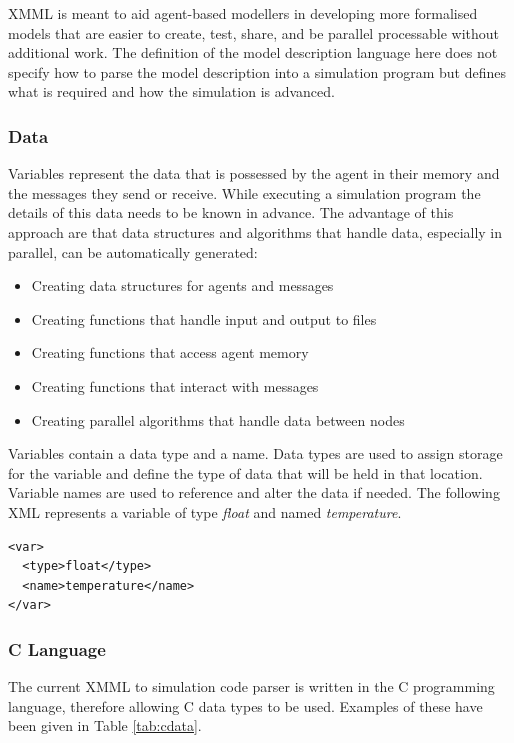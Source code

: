\documentclass[a4paper,11pt]{article}
\newenvironment{mylisting}
{\begin{list}{}{\setlength{\leftmargin}{1em}}\item\small\bfseries}
{\end{list}}
\begin{document}
XMML is meant to aid agent-based modellers in developing more
formalised models that are easier to create, test, share, and be
parallel processable without additional work. The definition of the
model description language here does not specify how to parse the
model description into a simulation program but defines what is
required and how the simulation is advanced.

\subsubsection{Data}

Variables represent the data that is possessed by the agent in their
memory and the messages they send or receive. While executing a
simulation program the details of this data needs to be known in advance. The advantage of this approach are that data structures and algorithms that handle data, especially in parallel, can be automatically generated:

\begin{itemize}
\item Creating data structures for agents and messages
\item Creating functions that handle input and output to files
\item Creating functions that access agent memory
\item Creating functions that interact with messages
\item Creating parallel algorithms that handle data between nodes
\end{itemize}

Variables contain a data type and a name. Data types are used to assign storage for the variable and define the type of data that will be held in that location. Variable names are used to reference and alter the data if needed. The following XML represents a variable of type \emph{float} and named \emph{temperature}.

\begin{mylisting}
\begin{verbatim}
<var>
  <type>float</type>
  <name>temperature</name>
</var>
\end{verbatim}
\end{mylisting}

\subsubsection{C Language}
The current XMML to simulation code parser is written in the C programming language, therefore allowing C data types to be used. Examples of these have been given in Table \ref{tab:cdata}.
\end{document}
